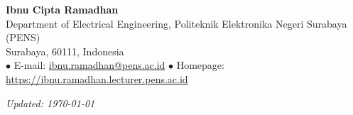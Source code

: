 \begin{center}
  {\LARGE\bfseries Ibnu Cipta Ramadhan}\\[4pt]
  Department of Electrical Engineering, Politeknik Elektronika Negeri Surabaya (PENS)\\[2pt]
  Surabaya, 60111, Indonesia\\[2pt]
  \small
  \quad$\bullet$\quad
  E-mail: \href{mailto:ibnu.ramadhan@pens.ac.id}{ibnu.ramadhan@pens.ac.id}
  \quad$\bullet$\quad
  Homepage: \href{https://ibnu.ramadhan.lecturer.pens.ac.id}{https://ibnu.ramadhan.lecturer.pens.ac.id}
  \\[12pt]
\end{center}

\vspace{20pt}
\noindent\textit{Updated: \today}
